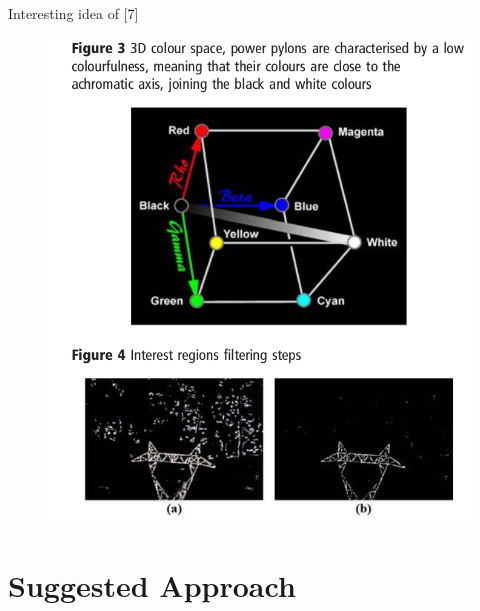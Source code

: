 \documentclass{beamer}
\begin{document}
\begin{frame}[t, fragile]{Interesting idea of [7]}
\begin{figure}
\centering
\includegraphics[scale=0.23]{colorful}
\end{figure}
\end{frame}

\section{Suggested Approach}
\end{document}
